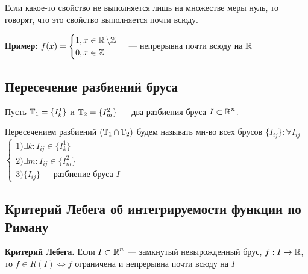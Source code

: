 \documentclass[a4paper, 10pt]{article}
\begin{document}
 Если какое-то свойство не выполняется лишь на множестве меры нуль, то говорят, что это свойство выполняется почти всюду.

\textbf{Пример:} $f(x) = \begin{cases}
        1, x \in \operatorname{\mathbb{R}}\backslash \mathbb{Z}\\
        0, x \in \mathbb{Z}
    \end{cases}$ --- непрерывна почти всюду на $\operatorname{\mathbb{R}}$

\subsection{Пересечение разбиений бруса}
 Пусть $\operatorname{\mathbb{T}}_1 = \{I^1_k\}$ и $\operatorname{\mathbb{T}}_2 = \{I^2_m\}$ — два разбиения бруса $I \subset \operatorname{\mathbb{R}}^n$. 

Пересечением разбиений $(\operatorname{\mathbb{T}}_1 \cap \operatorname{\mathbb{T}}_2)$ будем называть мн-во всех брусов $\{I_{ij}\}: \forall I_{ij}$
$\begin{cases}
    1) \exists k: I_{ij} \in \{I^1_k\}\\
    2) \exists m: I_{ij} \in \{I^2_m\}\\
    3) \{I_{ij}\} - \text{ разбиение бруса } I   
\end{cases}$

\subsection{Критерий Лебега об интегрируемости функции по Риману}
\theorem \textbf{Критерий Лебега.} Если $I\subset \operatorname{\mathbb{R}}^n$ — замкнутый невырожденный брус, $f: I\to\operatorname{\mathbb{R}}$, то $f\in R(I) \iff f$ ограничена и непрерывна почти всюду на $I$
\end{document}
